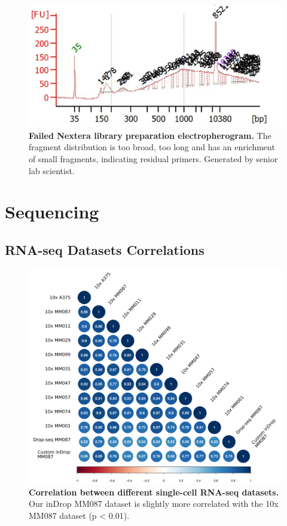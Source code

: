 \begin{appendix}
\begin{figure}[ht]
\centerfloat
\includegraphics[width=\textwidth]{./ims/indrop_failednextera.png}
\caption[Failed Nextera Library Preparation electropherogram]{\textbf{Failed Nextera library preparation electropherogram.} The fragment distribution is too broad, too long and has an enrichment of small fragments, indicating residual primers. Generated by senior lab scientist.}
\label{fig:supp_nextera}
\end{figure}

\clearpage
\section{Sequencing}

\subsection{RNA-seq Datasets Correlations}
\label{app:supp_seq_ind_reseq_corr}
\begin{figure}[ht]
\centerfloat
\includegraphics[width=\textwidth]{./ims/seq_ind_reseq_corr.png}
\caption[Correlations between different single-cell RNA-seq datasets]{\textbf{Correlation between different single-cell RNA-seq datasets.} Our inDrop MM087 dataset is slightly more correlated with the 10x MM087 dataset (p < 0.01).}
\label{fig:supp_seq_ind_reseq_corr}
\end{figure}


\end{appendix}
